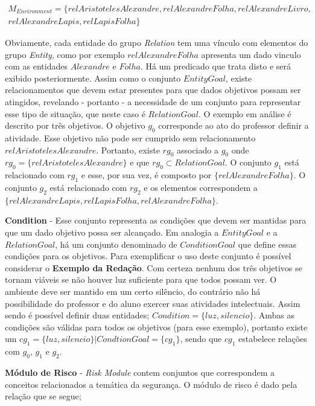 \begin{eqnarray}\label{Environment}\nonumber
    M_{Environment} = \{ relAristotelesAlexandre, relAlexandreFolha, relAlexandreLivro, \\ \nonumber
     relAlexandreLapis, relLapisFolha \}
\end{eqnarray}

Obviamente, cada entidade do grupo \textit{Relation} tem uma vínculo com elementos do grupo \textit{Entity}, como por exemplo 
$relAlexandreFolha$ apresenta um dado vinculo com as entidades $Alexandre$ e $Folha$. Há um predicado que trata disto e será
exibido posteriormente. Assim como o conjunto $EntityGoal$, existe relacionamentos que devem estar presentes para que dados 
objetivos possam ser atingidos, revelando - portanto - a necessidade de um conjunto para representar esse tipo de situação, 
que neste caso é $RelationGoal$. O exemplo em análise é descrito por três objetivos. O objetivo $g_0$ corresponde ao ato 
do professor definir a atividade. Esse objetivo não pode ser cumprido sem relacionamento $relAristotelesAlexandre$. 
Portanto, existe $rg_0$ associado a $g_0$ onde $rg_0 = \{ relAristotelesAlexandre \}$ e que $rg_0 \subset RelationGoal$. 
O conjunto $g_1$ está relacionado com $rg_1$ e esse, por sua vez, é composto por $\{ relAlexandreFolha\}$. O conjunto $g_2$ 
está relacionado com $rg_2$ e os elementos correspondem a $\{ relAlexandreLapis, relLapisFolha, relAlexandreFolha\}$.

\textbf{Condition} - Esse conjunto representa as condições que devem ser mantidas para que um dado objetivo possa ser alcançado. 
Em analogia a $EntityGoal$ e a $RelationGoal$, há um conjunto denominado de $ConditionGoal$ que define essas condições 
para os objetivos. Para exemplificar o uso deste conjunto é possível considerar o \textbf{Exemplo da Redação}. Com certeza
nenhum dos três objetivos se tornam viáveis se não houver luz suficiente para que todos possam ver. O ambiente deve ser mantido 
em um certo silêncio, do contrário não há possibilidade do professor e do aluno exercer suas atividades intelectuais. Assim sendo
é possível definir duas entidades; $Condition = \{ luz,silencio \}$. Ambas as condições são válidas para todos os objetivos (para esse
exemplo), portanto existe um $cg_1 = \{ luz,silencio \} | CondtionGoal = \{ cg_1 \}$, sendo que $cg_1$ estabelece relações com 
$g_0$, $g_1$ e $g_2$.

\textbf{Módulo de Risco} - \textit{Risk Module} contem conjuntos que correspondem a conceitos relacionados a temática da segurança.
O módulo de risco é dado pela relação que se segue;

